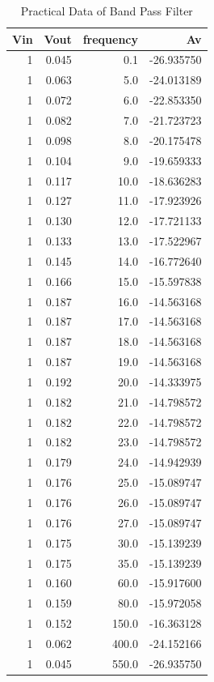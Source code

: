 \documentclass[12pt]{article}
\begin{document}
\begin{table}[h!]
    \centering
    \caption{Practical Data of Band Pass Filter}
    \begin{tabular}{rrrr}
        \hline
        Vin &  Vout &  frequency &         Av \\
        \hline
        1 & 0.045 &        0.1 & -26.935750 \\
        1 & 0.063 &        5.0 & -24.013189 \\
        1 & 0.072 &        6.0 & -22.853350 \\
        1 & 0.082 &        7.0 & -21.723723 \\
        1 & 0.098 &        8.0 & -20.175478 \\
        1 & 0.104 &        9.0 & -19.659333 \\
        1 & 0.117 &       10.0 & -18.636283 \\
        1 & 0.127 &       11.0 & -17.923926 \\
        1 & 0.130 &       12.0 & -17.721133 \\
        1 & 0.133 &       13.0 & -17.522967 \\
        1 & 0.145 &       14.0 & -16.772640 \\
        1 & 0.166 &       15.0 & -15.597838 \\
        1 & 0.187 &       16.0 & -14.563168 \\
        1 & 0.187 &       17.0 & -14.563168 \\
        1 & 0.187 &       18.0 & -14.563168 \\
        1 & 0.187 &       19.0 & -14.563168 \\
        1 & 0.192 &       20.0 & -14.333975 \\
        1 & 0.182 &       21.0 & -14.798572 \\
        1 & 0.182 &       22.0 & -14.798572 \\
        1 & 0.182 &       23.0 & -14.798572 \\
        1 & 0.179 &       24.0 & -14.942939 \\
        1 & 0.176 &       25.0 & -15.089747 \\
        1 & 0.176 &       26.0 & -15.089747 \\
        1 & 0.176 &       27.0 & -15.089747 \\
        1 & 0.175 &       30.0 & -15.139239 \\
        1 & 0.175 &       35.0 & -15.139239 \\
        1 & 0.160 &       60.0 & -15.917600 \\
        1 & 0.159 &       80.0 & -15.972058 \\
        1 & 0.152 &      150.0 & -16.363128 \\
        1 & 0.062 &      400.0 & -24.152166 \\
        1 & 0.045 &      550.0 & -26.935750 \\
        \hline
    \end{tabular}
\end{table}
\end{document}

